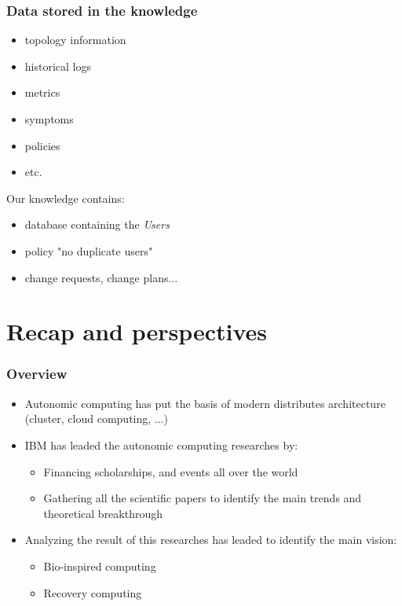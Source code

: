 \documentclass[11pt]{beamer}
\begin{document}
\begin{frame}
\frametitle{Data stored in the knowledge}
\begin{itemize}
\item topology information
\item historical logs
\item metrics
\item symptoms
\item policies
\item etc.
\end{itemize}
\begin{example}
Our knowledge contains:
\begin{itemize}
\item database containing the \textit{Users}
\item policy "no duplicate users"
\item change requests, change plans... 
\end{itemize}
\end{example}
\end{frame}
    
    \section{Recap and perspectives}
    \begin{frame}
        \frametitle{Overview}
        \begin{center}
        \begin{itemize}
			\item Autonomic computing has put the basis of modern distributes architecture (cluster, cloud computing, ...)
            \item IBM has leaded the autonomic computing researches by:
            \begin{itemize}
				\item Financing scholarships, and events all over the world
                \item Gathering all the scientific papers to identify the main trends and theoretical breakthrough
			\end{itemize}

            \item Analyzing the result of this researches has leaded to identify the main vision:
            \begin{itemize}
				\item Bio-inspired computing
                \item Recovery computing
			\end{itemize}
		\end{itemize}
		\end{center}
	\end{frame}
\end{document}
